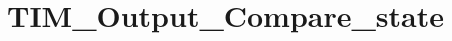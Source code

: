 \hypertarget{group___t_i_m___output___compare__state}{\section{T\-I\-M\-\_\-\-Output\-\_\-\-Compare\-\_\-state}
\label{group___t_i_m___output___compare__state}
}
